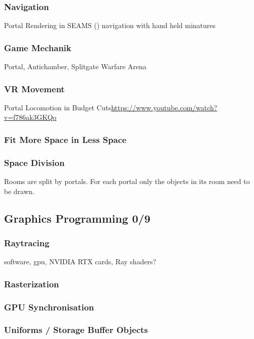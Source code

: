 \subsubsection{Navigation}
Portal Rendering in SEAMS (\cite{schmalstieg:1999:sewing})
\cite{pausch:1995:navigation} navigation with hand held minatures


\subsubsection{Game Mechanik}
Portal, Antichamber, Splitgate Warfare Arena

\subsubsection{VR Movement}

Portal Locomotion in Budget Cuts\url{https://www.youtube.com/watch?v=f786ak3GKQo}

\subsubsection{Fit More Space in Less Space}

\subsubsection{Space Division}
Rooms are split by portals. For each portal only the objects in its room need to be drawn.
\cite{ lowe:2005:technique}

\subsection{Graphics Programming 0/9}


\subsubsection{Raytracing}
software,
gpu,
NVIDIA RTX cards, Ray shaders?

\subsubsection{Rasterization}

\subsubsection{GPU Synchronisation}

\subsubsection{Uniforms / Storage Buffer Objects}

